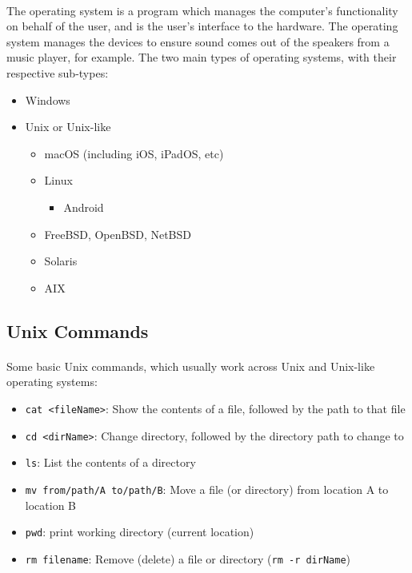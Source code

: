 \documentclass[letter,11pt]{article}
\begin{document}
\paragraph{}The operating system is a program which manages the computer's functionality on behalf of the user, and is the user's interface to the hardware. The operating system manages the devices to ensure sound comes out of the speakers from a music player, for example. The two main types of operating systems, with their respective sub-types:
\begin{itemize}
    \item Windows
    \item Unix or Unix-like
    \begin{itemize}
        \item macOS (including iOS, iPadOS, etc)
        \item Linux
        \begin{itemize}
            \item Android
        \end{itemize}
        \item FreeBSD, OpenBSD, NetBSD
        \item Solaris
        \item AIX
    \end{itemize}
\end{itemize}

\subsection{Unix Commands}
\paragraph{}Some basic Unix commands, which usually work across Unix and Unix-like operating systems:
\begin{itemize}
    \item \texttt{cat <fileName>}: Show the contents of a file, followed by the path to that file
    \item \texttt{cd <dirName>}: Change directory, followed by the directory path to change to
    \item \texttt{ls}: List the contents of a directory
    \item \texttt{mv from/path/A to/path/B}: Move a file (or directory) from location A to location B
    \item \texttt{pwd}: print working directory (current location)
    \item \texttt{rm filename}: Remove (delete) a file or directory (\texttt{rm -r dirName})
\end{itemize}
\end{document}
